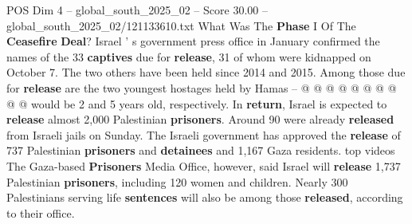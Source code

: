 \begin{textsample}{POS Dim 4 – global\_south\_2025\_02 – Score 30.00 – global\_south\_2025\_02/121133610.txt}
What Was The \textbf{Phase} I Of The \textbf{Ceasefire} \textbf{Deal}?
Israel ' s government press office in January confirmed the names of the 33 \textbf{captives} due for \textbf{release}, 31 of whom were kidnapped on October 7.
The two others have been held since 2014 and 2015.
Among those due for \textbf{release} are the two youngest hostages held by Hamas -- @ @ @ @ @ @ @ @ @ @ would be 2 and 5 years old, respectively.
In \textbf{return}, Israel is expected to \textbf{release} almost 2,000 Palestinian \textbf{prisoners}.
Around 90 were already \textbf{released} from Israeli jails on Sunday.
The Israeli government has approved the \textbf{release} of 737 Palestinian \textbf{prisoners} and \textbf{detainees} and 1,167 Gaza residents. top videos The Gaza-based \textbf{Prisoners} Media Office, however, said Israel will \textbf{release} 1,737 Palestinian \textbf{prisoners}, including 120 women and children.
Nearly 300 Palestinians serving life \textbf{sentences} will also be among those \textbf{released}, according to their office.

\end{textsample}
